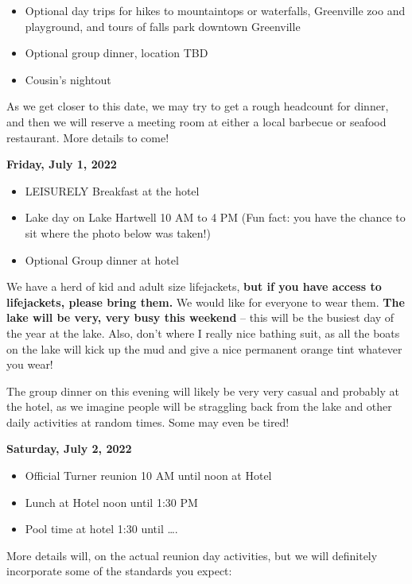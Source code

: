 \documentclass[
]{book}
\providecommand{\tightlist}{%
  \setlength{\itemsep}{0pt}\setlength{\parskip}{0pt}}
\begin{document}
\begin{itemize}
\tightlist
\item
  Optional day trips for hikes to mountaintops or waterfalls, Greenville zoo and playground, and tours of falls park downtown Greenville
\item
  Optional group dinner, location TBD
\item
  Cousin's nightout
\end{itemize}

As we get closer to this date, we may try to get a rough headcount for dinner, and then we will reserve a meeting room at either a local barbecue or seafood restaurant. More details to come!

\textbf{Friday, July 1, 2022}

\begin{itemize}
\tightlist
\item
  LEISURELY Breakfast at the hotel
\item
  Lake day on Lake Hartwell 10 AM to 4 PM (Fun fact: you have the chance to sit where the photo below was taken!)
\item
  Optional Group dinner at hotel
\end{itemize}

We have a herd of kid and adult size lifejackets, \textbf{but if you have access to lifejackets, please bring them.} We would like for everyone to wear them. \textbf{The lake will be very, very busy this weekend} -- this will be the busiest day of the year at the lake. Also, don't where I really nice bathing suit, as all the boats on the lake will kick up the mud and give a nice permanent orange tint whatever you wear!

The group dinner on this evening will likely be very very casual and probably at the hotel, as we imagine people will be straggling back from the lake and other daily activities at random times. Some may even be tired!

\textbf{Saturday, July 2, 2022}

\begin{itemize}
\tightlist
\item
  Official Turner reunion 10 AM until noon at Hotel
\item
  Lunch at Hotel noon until 1:30 PM
\item
  Pool time at hotel 1:30 until \ldots.
\end{itemize}

More details will, on the actual reunion day activities, but we will definitely incorporate some of the standards you expect:
\end{document}
